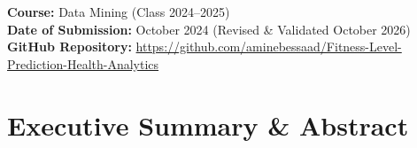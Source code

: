 \documentclass[11pt,a4paper]{article}
\begin{document}
\begin{titlepage}
\vfill

{\small\textbf{Course:} Data Mining (Class 2024--2025)\\[2pt]
\textbf{Date of Submission:} October 2024 (Revised \& Validated October 2026)\\[2pt]
\textbf{GitHub Repository:} \url{https://github.com/aminebessaad/Fitness-Level-Prediction-Health-Analytics}}

\vspace*{0.3cm}
\end{titlepage}

\thispagestyle{plain}
\section*{Executive Summary \& Abstract}
\end{document}
